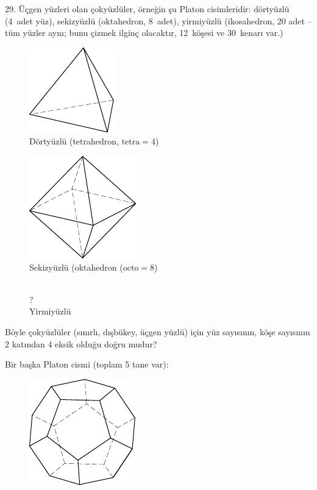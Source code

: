 \begin{problem}{29.}
	Üçgen yüzleri olan çokyüzlüler, örneğin şu Platon cisimleridir: dörtyüzlü (4~adet yüz), sekizyüzlü (oktahedron, 8~adet), yirmiyüzlü (ikosahedron, 20 adet -- tüm yüzler aynı; bunu çizmek ilginç olacaktır, 12~köşesi ve 30~kenarı var.)
	\begin{figure}
		\footnotesize
		\null\hfill
		\parbox{0.3\linewidth}{\centering\includegraphics{resources/taskbook-131}\\Dörtyüzlü (tetrahedron, $\text{tetra}= 4$)}
		\hfill
		\parbox{0.3\linewidth}{\centering\includegraphics{resources/taskbook-132}\\Sekizyüzlü (oktahedron ($\text{octo}= 8$)}
		\hfill\null\\
		{\Huge ?}\\Yirmiyüzlü
	\end{figure}
Böyle çokyüzlüler (sınırlı, dışbükey, üçgen yüzlü) için yüz sayısının, köşe sayısının 2 katından 4 eksik olduğu doğru mudur?

Bir başka Platon cismi (toplam 5 tane var):
	\begin{figure}
		\includegraphics{resources/taskbook-14}
	\end{figure}
\end{problem}

